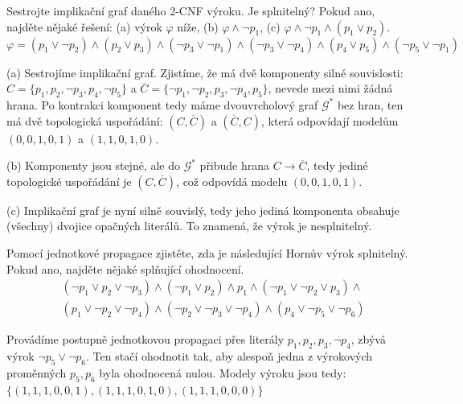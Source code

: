 \begin{problem} \label{problem:2sat}
    
    Sestrojte implikační graf daného 2-CNF výroku. Je splnitelný? Pokud ano, najděte nějaké řešení: (a) výrok $\varphi$ níže, (b) $\varphi\land\neg p_1$, (c) $\varphi\land\neg p_1\land(p_1\lor p_2)$.
    $$
    \varphi=(p_1\vee \neg p_2)\wedge (p_2\vee p_3)\wedge (\neg p_3\vee \neg p_1)\wedge (\neg p_3\vee \neg p_4)\wedge (p_4\vee p_5)\wedge (\neg p_5\vee \neg p_1)
    $$

    \begin{solution}
        (a) Sestrojíme implikační graf. Zjistíme, že má dvě komponenty silné souvislosti: $C=\{p_1,p_2,\neg p_3,p_4,\neg p_5\}$ a $\overline{C}=\{\neg p_1,\neg p_2,p_3,\neg p_4,p_5\}$, nevede mezi nimi žádná hrana. Po kontrakci komponent tedy máme dvouvrcholový graf $\mathcal G^*$ bez hran, ten má dvě topologická uspořádání: $(C,\overline{C})$ a $(\overline{C},C)$, která odpovídají modelům $(0,0,1,0,1)$ a $(1,1,0,1,0)$.
        
        (b) Komponenty jsou stejné, ale do $\mathcal G^*$ přibude hrana $C\to\overline{C}$, tedy jediné topologické uspořádání je $(C,\overline{C})$, což odpovídá modelu $(0,0,1,0,1)$.

        (c) Implikační graf je nyní silně souvislý, tedy jeho jediná komponenta obsahuje (všechny) dvojice opačných literálů. To znamená, že výrok je nesplnitelný.
    \end{solution}

\end{problem}


\begin{problem}

    Pomocí jednotkové propagace zjistěte, zda je následující Hornův výrok splnitelný. Pokud ano, najděte nějaké splňující ohodnocení.
    \begin{align*}
        &(\neg p_1 \vee p_2 \vee \neg p_3)\wedge(\neg p_1 \vee p_2)\wedge p_1 \wedge (\neg p_1 \vee \neg p_2 \vee p_3)\wedge \\
        &(p_1\vee\neg p_2 \vee \neg p_4)\wedge(\neg p_2 \vee \neg p_3 \vee \neg p_4)\wedge(p_4\vee \neg p_5 \vee\neg p_6)
    \end{align*}

    \begin{solution}
        Provádíme postupně jednotkovou propagaci přes literály $p_1,p_2,p_3,\neg p_4$, zbývá výrok $\neg p_5\lor\neg p_6$. Ten stačí ohodnotit tak, aby alespoň jedna z výrokových proměnných $p_5,p_6$ byla ohodnocená nulou. Modely výroku jsou tedy: $\{(1,1,1,0,0,1),(1,1,1,0,1,0),(1,1,1,0,0,0)\}$                
    \end{solution}
    
\end{problem}


